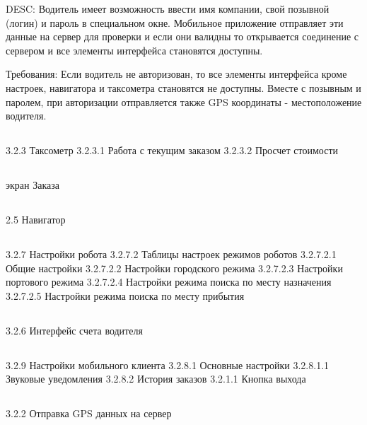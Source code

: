     		DESC: Водитель имеет возможность ввести имя компании, свой позывной (логин) и пароль в специальном окне. Мобильное приложение отправляет эти данные на сервер для проверки и если они валидны то открывается соединение с сервером и все элементы интерфейса становятся доступны.

    		Требования: 
				Если водитель не авторизован, то все элементы интерфейса кроме настроек, навигатора и таксометра становятся не доступны.
				Вместе с позывным и паролем, при авторизации отправляется также GPS координаты - местоположение водителя.



    \subsection{}


3.2.3 Таксометр
3.2.3.1 Работа с текущим заказом
3.2.3.2 Просчет стоимости

    \subsection{}

экран Заказа

    \subsection{}


2.5 Навигатор

    \subsection{}



3.2.7 Настройки робота
3.2.7.2 Таблицы настроек режимов роботов
3.2.7.2.1 Общие настройки
3.2.7.2.2 Настройки городского режима
3.2.7.2.3 Настройки портового режима
3.2.7.2.4 Настройки режима поиска по месту назначения
3.2.7.2.5 Настройки режима поиска по месту прибытия

    \subsection{}

    3.2.6 Интерфейс счета водителя


    \subsection{}

    3.2.9 Настройки мобильного клиента
3.2.8.1 Основные настройки
3.2.8.1.1 Звуковые уведомления
3.2.8.2 История заказов
3.2.1.1 Кнопка выхода

	\subsection{}

	3.2.2 Отправка GPS данных на сервер